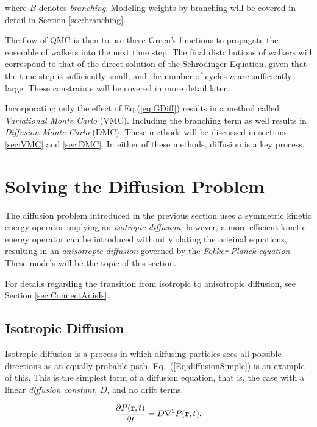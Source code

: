 where $B$ denotes \textit{branching}. Modeling weights by branching will be covered in detail in Section \ref{sec:branching}.

The flow of QMC is then to use these Green's functions to propagate the ensemble of walkers into the next time step. The final distributions of walkers will correspond to that of the direct solution of the Schrödinger Equation, given that the time step is sufficiently small, and the number of cycles $n$ are sufficiently large. These constraints will be covered in more detail later. 

Incorporating only the effect of Eq.(\ref{eq:GDiff}) results in a method called \textit{Variational Monte Carlo} (VMC). Including the branching term as well results in \textit{Diffusion Monte Carlo} (DMC). These methods will be discussed in sections \ref{sec:VMC} and \ref{sec:DMC}. In either of these methods, diffusion is a key process.

\section{Solving the Diffusion Problem}

The diffusion problem introduced in the previous section uses a symmetric kinetic energy operator implying an \textit{isotropic diffusion}, however, a more efficient kinetic energy operator can be introduced without violating the original equations, resulting in an \textit{anisotropic diffusion} governed by the \textit{Fokker-Planck equation}. These models will be the topic of this section. 

For details regarding the transition from isotropic to anisotropic diffusion, see Section \ref{sec:ConnectAnisIs}.

\subsection{Isotropic Diffusion}

Isotropic diffusion is a process in which diffusing particles sees all possible directions as an equally probable path. Eq.~(\ref{Eq:diffusionSimple}) is an example of this. This is the simplest form of a diffusion equation, that is, the case with a linear \textit{diffusion constant}, $D$, and no drift terms.

\begin{equation}
 \label{Eq:diffusionSimple}
 \frac{\partial P(\mathbf{r}, t)}{\partial t} = D\nabla^2 P(\mathbf{r}, t) .
\end{equation}

